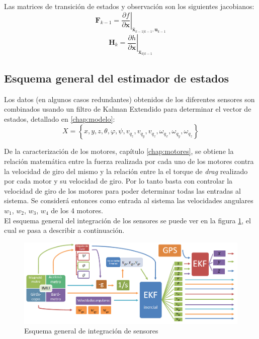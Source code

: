 \documentclass[main]{subfiles}
\begin{document}
Las matrices de transición de estados y observación son los siguientes jacobianos:
$$ { \mathbf{F}_{k-1}} = \left . \frac{\partial f}{\partial \mathbf{x} } \right \vert _{\hat{\mathbf{x}}_{k-1|k-1},\mathbf{u}_{k-1}} $$
\vspace{10pt}
$$ { \mathbf{H}_{k}} = \left . \frac{\partial h}{\partial \mathbf{x} } \right \vert _{\hat{\mathbf{x}}_{k|k-1}} $$


\subsection{Esquema general del estimador de estados}

Los datos (en algunos casos redundantes) obtenidos de los diferentes sensores son combinados usando un filtro de Kalman Extendido para determinar el vector de estados, detallado en \ref{chap:modelo}:
\begin{equation}
  \label{eq:estado}
  X=\left\lbrace  x,y,z, \theta,\varphi,\psi, v_{q_z},v_{q_y},v_{q_z},\omega_{q_x},\omega_{q_y},\omega_{q_z} \right\rbrace
\end{equation}

De la caracterización de los motores, capítulo \ref{chap:motores}, se obtiene la relación matemática entre la fuerza realizada por cada uno de los motores contra la velocidad de giro del mismo y la relación entre la el torque de \emph{drag} realizado por cada motor y su velocidad de giro. Por lo tanto basta con controlar la velocidad de giro de los motores para poder determinar todas las entradas al sistema. Se considerá entonces como entrada al sistema las velocidades angulares $w_1$, $w_2$, $w_3$, $w_4$ de los 4 motores.\\

El esquema general del integración de los sensores se puede ver en la figura \ref{fig:diagrama_kalman}, el cual se pasa a describir a continuación.

\begin{figure}[h!]
	\centering
	\includegraphics[width=1\textwidth]{./pics_kalman/diagrama_kalman.png}
	\caption{Esquema general de integración de sensores}
	\label{fig:diagrama_kalman}
\end{figure}
\end{document}
